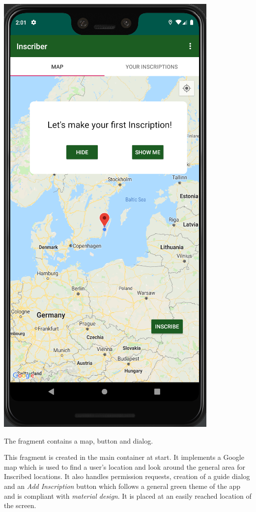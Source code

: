 \documentclass[]{article}
\begin{document}
\begin{flushleft}
\begin{floatingfigure}[r]{0.3\linewidth}
	\includegraphics[scale=0.4]{mapfrag.png}
	\caption{The fragment contains a map, button and dialog.}
	\label{fig:map}
	\vspace{\dimexpr0.3\baselineskip-\topskip}
\end{floatingfigure}
\medskip
This fragment is created in the main container at start. It implements a Google map which is used to find a user's location and look around the general area for Inscribed locations. It also handles permission requests, creation of a guide dialog and an \textit{Add Inscription} button which follows a general green theme of the app and is compliant with \textit{material design}\parencite{buttons}. It is placed at an easily reached location of the screen.\medskip


\end{flushleft}
\end{document}
